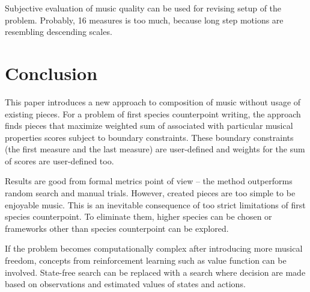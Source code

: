 \documentclass{article}
\begin{document}
Subjective evaluation of music quality can be used for revising setup of the problem. Probably, 16 measures is too much, because long step motions are resembling descending scales.


\section{Conclusion}
\label{sec:conclusion}

This paper introduces a new approach to composition of music without usage of existing pieces. For a problem of first species counterpoint writing, the approach finds pieces that maximize weighted sum of associated with particular musical properties scores subject to boundary constraints. These boundary constraints (the first measure and the last measure) are user-defined and weights for the sum of scores are user-defined too.

Results are good from formal metrics point of view -- the method outperforms random search and manual trials. However, created pieces are too simple to be enjoyable music. This is an inevitable consequence of too strict limitations of first species counterpoint. To eliminate them, higher species can be chosen or frameworks other than species counterpoint can be explored.

If the problem becomes computationally complex after introducing more musical freedom, concepts from reinforcement learning such as value function can be involved. State-free search can be replaced with a search where decision are made based on observations and estimated values of states and actions. 


  

\end{document}

